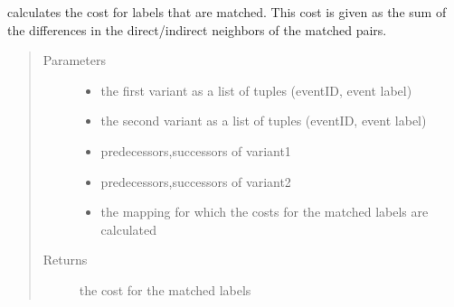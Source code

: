 \documentclass[letterpaper,10pt,english]{sphinxmanual}
\begin{document}
\begin{fulllineitems}
\label{\detokenize{cost function:costFunction.cost.costMatched}}
calculates the cost for labels that are matched. This cost is given as the sum of the differences in the direct/indirect neighbors of the matched pairs.
\begin{quote}\begin{description}
\item[{Parameters}] \leavevmode\begin{itemize}
\item {} 
 \textendash{} the first variant as a list of tuples (eventID, event label)

\item {} 
 \textendash{} the second variant as a list of tuples (eventID, event label)

\item {} 
 \textendash{} predecessors,successors of variant1

\item {} 
 \textendash{} predecessors,successors of variant2

\item {} 
 \textendash{} the mapping for which the costs for the matched labels are calculated

\end{itemize}

\item[{Returns}] \leavevmode
the cost for the matched labels

\end{description}\end{quote}

\end{fulllineitems}

\end{document}
